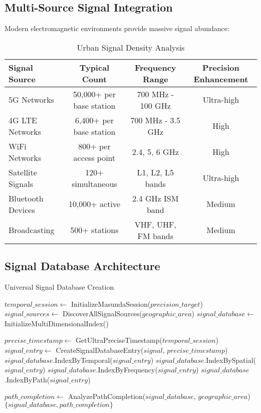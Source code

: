 \documentclass[12pt,a4paper]{article}
\begin{document}
\subsection{Multi-Source Signal Integration}

Modern electromagnetic environments provide massive signal abundance:

\begin{table}[htbp]
\centering
\caption{Urban Signal Density Analysis}
\begin{tabular}{@{}lccc@{}}
\toprule
\textbf{Signal Source} & \textbf{Typical Count} & \textbf{Frequency Range} & \textbf{Precision Enhancement} \\
\midrule
5G Networks & 50,000+ per base station & 700 MHz - 100 GHz & Ultra-high \\
4G LTE Networks & 6,400+ per base station & 700 MHz - 3.5 GHz & High \\
WiFi Networks & 800+ per access point & 2.4, 5, 6 GHz & High \\
Satellite Signals & 120+ simultaneous & L1, L2, L5 bands & Ultra-high \\
Bluetooth Devices & 10,000+ active & 2.4 GHz ISM band & Medium \\
Broadcasting & 500+ stations & VHF, UHF, FM bands & Medium \\
\bottomrule
\end{tabular}
\end{table}

\subsection{Signal Database Architecture}

\begin{algorithm}
\caption{Universal Signal Database Creation}
\begin{algorithmic}[1]
    \State $temporal\_session \gets$ InitializeMasundaSession($precision\_target$)
    \State $signal\_sources \gets$ DiscoverAllSignalSources($geographic\_area$)
    \State $signal\_database \gets$ InitializeMultiDimensionalIndex()
    
        \State $precise\_timestamp \gets$ GetUltraPreciseTimestamp($temporal\_session$)
        \State $signal\_entry \gets$ CreateSignalDatabaseEntry($signal$, $precise\_timestamp$)
        \State $signal\_database$.IndexByTemporal($signal\_entry$)
        \State $signal\_database$.IndexBySpatial($signal\_entry$)
        \State $signal\_database$.IndexByFrequency($signal\_entry$)
        \State $signal\_database$.IndexByPath($signal\_entry$)
    \EndFor
    
    \State $path\_completion \gets$ AnalyzePathCompletion($signal\_database$, $geographic\_area$)
    \State \Return $\{signal\_database, path\_completion\}$
\EndProcedure
\end{algorithmic}
\end{algorithm}
\end{document}
